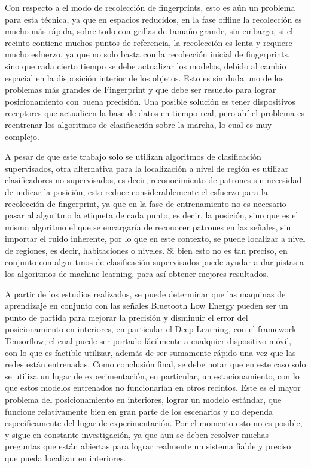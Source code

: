 Con respecto a el modo de recolección de fingerprints, esto es aún un problema para esta técnica, ya que en espacios reducidos, en la fase offline la recolección es mucho más rápida, sobre todo con grillas de tamaño grande, sin embargo, si el recinto contiene muchos puntos de referencia, la recolección es lenta y requiere mucho esfuerzo, ya que no solo basta con la recolección inicial de fingerprints, sino que cada cierto tiempo se debe actualizar los modelos, debido al cambio espacial en la disposición interior de los objetos. Esto es sin duda uno de los problemas más grandes de Fingerprint y que debe ser resuelto para lograr posicionamiento con buena precisión. Una posible solución es tener dispositivos receptores que actualicen la base de datos en tiempo real, pero ahí el problema es reentrenar los algoritmos de clasificación sobre la marcha, lo cual es muy complejo.

A pesar de que este trabajo solo se utilizan algoritmos de clasificación supervisados, otra alternativa para la localización a nivel de región es utilizar clasificadores no supervisados, es decir, reconocimiento de patrones sin necesidad de indicar la posición, esto reduce considerablemente el esfuerzo para la recolección de fingerprint, ya que en la fase de entrenamiento no es necesario pasar al algoritmo la etiqueta de cada punto, es decir, la posición, sino que es el mismo algoritmo el que se encargaría de reconocer patrones en las señales, sin importar el ruido inherente, por lo que en este contexto, se puede localizar a nivel de regiones, es decir, habitaciones o niveles. Si bien esto no es tan preciso, en conjunto con algoritmos de clasificación supervisados puede ayudar a dar pistas a los algoritmos de machine learning, para así obtener mejores resultados.


A partir de los estudios realizados, se puede determinar que las maquinas de aprendizaje en conjunto con las señales Bluetooth Low Energy pueden ser un punto de partida para mejorar la precisión y disminuir el error del posicionamiento en interiores, en particular el Deep Learning, con el framework Tensorflow, el cual puede ser portado fácilmente a cualquier dispositivo móvil, con lo que es factible utilizar, además de ser sumamente rápido una vez que las redes están entrenadas. Como conclusión final, se debe notar que en este caso solo se utiliza un lugar de experimentación, en particular, un estacionamiento, con lo que estos modelos entrenados no funcionarían en otros recintos. Este es el mayor problema del posicionamiento en interiores, lograr un modelo estándar, que funcione relativamente bien en gran parte de los escenarios y no dependa específicamente del lugar de experimentación. Por el momento esto no es posible, y sigue en constante investigación, ya que aun se deben resolver muchas preguntas que están abiertas para lograr realmente un sistema fiable y preciso que pueda localizar en interiores.